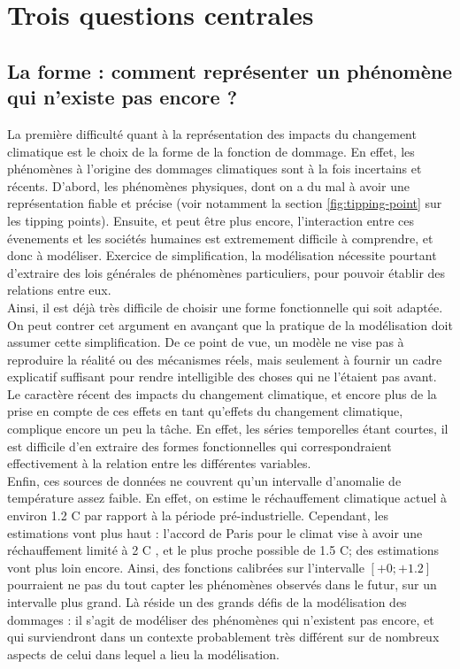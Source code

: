 \section{Trois questions centrales}


\subsection{La forme : comment représenter un phénomène qui n'existe pas encore ?}
\label{ss:forme}

La première difficulté quant à la représentation des impacts du changement climatique est le choix de la forme de la fonction de dommage. En effet, les phénomènes à l'origine des dommages climatiques sont à la fois incertains et récents. D'abord, les phénomènes physiques, dont on a du mal à avoir une représentation fiable et précise (voir notamment la section \ref{fig:tipping-point} sur les tipping points). Ensuite, et peut être plus encore, l'interaction entre ces évenements et les sociétés humaines est extremement difficile à comprendre, et donc à modéliser. Exercice de simplification, la modélisation nécessite pourtant d'extraire des lois générales de phénomènes particuliers, pour pouvoir établir des relations entre eux. \\

Ainsi, il est déjà très difficile de choisir une forme fonctionnelle qui soit adaptée. On peut contrer cet argument en avançant que la pratique de la modélisation doit assumer cette simplification. De ce point de vue, un modèle ne vise pas à reproduire la réalité ou des mécanismes réels, mais seulement à fournir un cadre explicatif suffisant pour rendre intelligible des choses qui ne l'étaient pas avant. \\

Le caractère récent des impacts du changement climatique, et encore plus de la prise en compte de ces effets en tant qu'effets du changement climatique, complique encore un peu la tâche. En effet, les séries temporelles étant courtes, il est difficile d'en extraire des formes fonctionnelles qui correspondraient effectivement à la relation entre les différentes variables. \\

Enfin, ces sources de données ne couvrent qu'un intervalle d'anomalie de température assez faible. En effet, on estime le réchauffement climatique actuel à environ 1.2 \textdegree C par rapport à la période pré-industrielle. Cependant, les estimations vont plus haut : l'accord de Paris pour le climat vise à avoir une réchauffement limité à 2 \textdegree C , et le plus proche possible de 1.5 \textdegree C; des estimations vont plus loin encore. Ainsi, des fonctions calibrées sur l'intervalle $[+0; +1.2]$ pourraient ne pas du tout capter les phénomènes observés dans le futur, sur un intervalle plus grand. Là réside un des grands défis de la modélisation des dommages : il s'agit de modéliser des phénomènes qui n'existent pas encore, et qui surviendront dans un contexte probablement très différent sur de nombreux aspects de celui dans lequel a lieu la modélisation. 

